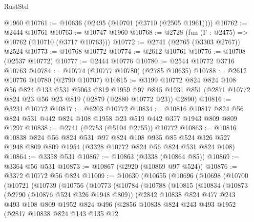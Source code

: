 \begin{lexlean}{RustStd}
\begin{coremodule}
    @1960
@10761 := @10636 (@2495 (@10701 (@3710 (@2505 @1961))))
@10762 := @2444 @10761
@10763 := @10747 @1960
@10768 := @2728 (fun (Γ : @2475) => @10762 (@10710 (@3717 @10763)))
@10772 := @2741 (@2765 (@3303 @2767)) @2524
@10773 := @10768 @10772
@10774 := @2612 @10761
@10776 := @10708 (@2537 @10772)
@10777 := @2444 @10776
@10780 := @2544 @10772 @3716 @10763
@10784 := @10774 (@10777 @10780) (@2785 @10635)
@10788 := @2612 @10776 @10780 (@2790 @10707)
@10815 := @3199
    @10772
    @824
    @824
    @108
    @56
    @824
    @133
    @531
    @5063
    @819
    @1959
    @97
    @845
    @1931
    @851
    (@2871 @10772 @824 @23 @56 @23 @819 (@2879 (@2880 @10772 @23)) @2890)
@10816 := @3231 @10772
@10817 := @6203 @10772
@10834 := @10816
    @10817
    @824
    @56
    @824
    @531
    @442
    @824
    @108
    @1958
    @23
    @519
    @442
    @377
    @1943
    @809
    @809
    @1297
@10838 := @2741 (@2753 (@5104 @2755)) @10772
@10863 := @10816
    @10838
    @824
    @56
    @824
    @531
    @97
    @824
    @108
    @935
    @85
    @524
    @326
    @527
    @1948
    @809
    @809
    @1954
    (@3328 @10772 @824 @56 @824 @531 @824 @108)
@10864 := @3358 @531
@10867 := @10863 (@3338 (@10864 @85))
@10869 := @3364 @56 @531
@10873 := @10867 (@2920 (@10869 @97 @524))
@10876 := @3372 @10772 @56 @824
@11009 := @10630
    (@10655
      (@10696
        (@10698
          (@10700
            (@10721
              (@10739
                (@10756
                  (@10773
                    (@10784
                      (@10788
                        (@10815
                          (@10834
                            (@10873
                              (@2790 (@10876 @524 @326 @1948 @809))
                              (@2842
                                @10838
                                @824
                                @477
                                @243
                                @493
                                @108
                                @809
                                @1952
                                @824
                                @496
                                (@2856
                                  @10838
                                  @824
                                  @243
                                  @493
                                  @1952
                                  (@2817
                                    @10838
                                    @824
                                    @143
                                    @135
                                    @12

\end{coremodule}
\end{lexlean}
